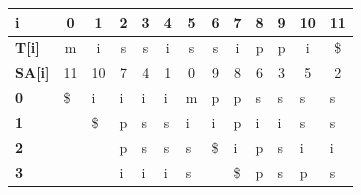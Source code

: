 \begin{table}[!htb]
\centering
\label{my-label10}
\begin{tabular}{|l|l|l|l|l|l|l|l|l|l|l|l|l|}
\hline
\textbf{i}         & \multicolumn{1}{c|}{0}  & \multicolumn{1}{c|}{1}  & \multicolumn{1}{c|}{2} & \multicolumn{1}{c|}{3} & \multicolumn{1}{c|}{4} & \multicolumn{1}{c|}{5} & \multicolumn{1}{c|}{6} & \multicolumn{1}{c|}{7} & \multicolumn{1}{c|}{8} & \multicolumn{1}{c|}{9} & \multicolumn{1}{c|}{10} & \multicolumn{1}{c|}{11} \\ \hline
\textbf{T{[}i{]}}  & \multicolumn{1}{c|}{m}  & \multicolumn{1}{c|}{i}  & \multicolumn{1}{c|}{s} & \multicolumn{1}{c|}{s} & \multicolumn{1}{c|}{i} & \multicolumn{1}{c|}{s} & \multicolumn{1}{c|}{s} & \multicolumn{1}{c|}{i} & \multicolumn{1}{c|}{p} & \multicolumn{1}{c|}{p} & \multicolumn{1}{c|}{i}  & \multicolumn{1}{c|}{\$}  \\ \hline
\textbf{SA{[}i{]}} & \multicolumn{1}{c|}{11} & \multicolumn{1}{c|}{10} & \multicolumn{1}{c|}{7} & \multicolumn{1}{c|}{4} & \multicolumn{1}{c|}{1} & \multicolumn{1}{c|}{0} & \multicolumn{1}{c|}{9} & \multicolumn{1}{c|}{8} & \multicolumn{1}{c|}{6} & \multicolumn{1}{c|}{3} & \multicolumn{1}{c|}{5}  & \multicolumn{1}{c|}{2}  \\ \hline
\textbf{0}                                                       & \$                       & i                       & i                      & i                      & i                      & m                      & p                      & p                      & s                      & s                      & s                       & s                       \\ \hline
\textbf{1}                                                       &                         & \$                       & p                      & s                      & s                      & i                      & i                      & p                      & i                      & i                      & s                       & s                       \\ \hline
\textbf{2}                                                       &                         &                         & p                      & s                      & s                      & s                      & \$                      & i                      & p                      & s                      & i                       & i                       \\ \hline
\textbf{3}                                                       &                         &                         & i                      & i                      & i                      & s                      &                        & \$                      & p                      & s                      & p                       & s                       \\ \hline

\end{tabular}
\end{table}
